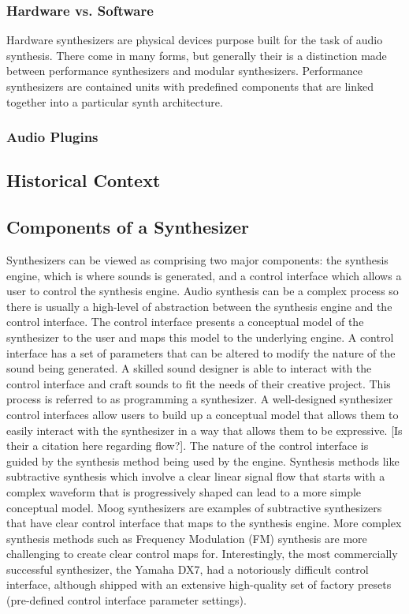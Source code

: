 \subsubsection{Hardware vs. Software}
Hardware synthesizers are physical devices purpose built for the task of audio synthesis. There come in many forms, but generally their is a distinction made between performance synthesizers and modular synthesizers. Performance synthesizers are contained units with predefined components that are linked together into a particular synth architecture.

\subsubsection{Audio Plugins}

\subsection{Historical Context}


\subsection{Components of a Synthesizer}
Synthesizers can be viewed as comprising two major components: the synthesis engine, which is where sounds is generated, and a control interface which allows a user to control the synthesis engine. Audio synthesis can be a complex process so there is usually a high-level of abstraction between the synthesis engine and the control interface. The control interface presents a conceptual model of the synthesizer to the user and maps this model to the underlying engine. A control interface has a set of parameters that can be altered to modify the nature of the sound being generated. A skilled sound designer is able to interact with the control interface and craft sounds to fit the needs of their creative project. This process is referred to as programming a synthesizer. A well-designed synthesizer control interfaces allow users to build up a conceptual model that allows them to easily interact with the synthesizer in a way that allows them to be expressive. [Is their a citation here regarding flow?]. The nature of the control interface is guided by the synthesis method being used by the engine. Synthesis methods like subtractive synthesis which involve a clear linear signal flow that starts with a complex waveform that is progressively shaped can lead to a more simple conceptual model. Moog synthesizers are examples of subtractive synthesizers that have clear control interface that maps to the synthesis engine. More complex synthesis methods such as Frequency Modulation (FM) synthesis are more challenging to create clear control maps for. Interestingly, the most commercially successful synthesizer, the Yamaha DX7, had a notoriously difficult control interface, although shipped with an extensive high-quality set of factory presets (pre-defined control interface parameter settings).

